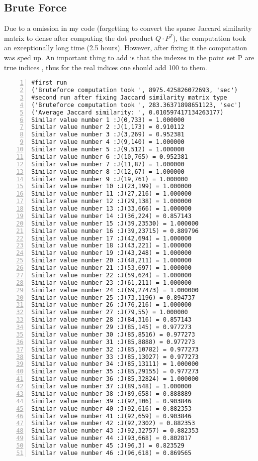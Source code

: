 \subsection{Brute Force}
Due to a omission in my code (forgetting to convert the sparse Jaccard similarity matrix to dense after computing the dot product $Q \cdot P^T$), the computation took an exceptionally long time (2.5 hours). However, after fixing it the computation was sped up. An important thing to add is that the indexes in the point set P are true indices , thus for the real indices one should add 100 to them.

\begin{lstlisting}[language={},numbers=left,numberstyle=\tiny,frame=single,breaklines=true,postbreak=\mbox{\textcolor{red}{$\hookrightarrow$}\space}]
#first run
('Bruteforce computation took ', 8975.425826072693, 'sec')
#second run after fixing Jaccard similarity matrix type
('Bruteforce computation took ', 283.36371898651123, 'sec')
('Average Jaccard similarity: ', 0.010597417134263177)
Similar value number 1 :J(0,733) = 1.000000
Similar value number 2 :J(1,173) = 0.910112
Similar value number 3 :J(3,269) = 0.952381
Similar value number 4 :J(9,140) = 1.000000
Similar value number 5 :J(9,512) = 1.000000
Similar value number 6 :J(10,765) = 0.952381
Similar value number 7 :J(11,87) = 1.000000
Similar value number 8 :J(12,67) = 1.000000
Similar value number 9 :J(19,761) = 1.000000
Similar value number 10 :J(23,199) = 1.000000
Similar value number 11 :J(27,216) = 1.000000
Similar value number 12 :J(29,138) = 1.000000
Similar value number 13 :J(33,666) = 1.000000
Similar value number 14 :J(36,224) = 0.857143
Similar value number 15 :J(39,23530) = 1.000000
Similar value number 16 :J(39,23715) = 0.889796
Similar value number 17 :J(42,694) = 1.000000
Similar value number 18 :J(43,221) = 1.000000
Similar value number 19 :J(43,248) = 1.000000
Similar value number 20 :J(48,211) = 1.000000
Similar value number 21 :J(53,697) = 1.000000
Similar value number 22 :J(59,624) = 1.000000
Similar value number 23 :J(61,211) = 1.000000
Similar value number 24 :J(69,27473) = 1.000000
Similar value number 25 :J(73,1196) = 0.894737
Similar value number 26 :J(76,216) = 1.000000
Similar value number 27 :J(79,55) = 1.000000
Similar value number 28 :J(84,316) = 0.857143
Similar value number 29 :J(85,145) = 0.977273
Similar value number 30 :J(85,8516) = 0.977273
Similar value number 31 :J(85,8888) = 0.977273
Similar value number 32 :J(85,10782) = 0.977273
Similar value number 33 :J(85,13027) = 0.977273
Similar value number 34 :J(85,13111) = 1.000000
Similar value number 35 :J(85,29155) = 0.977273
Similar value number 36 :J(85,32824) = 1.000000
Similar value number 37 :J(89,548) = 1.000000
Similar value number 38 :J(89,658) = 0.888889
Similar value number 39 :J(92,106) = 0.903846
Similar value number 40 :J(92,616) = 0.882353
Similar value number 41 :J(92,659) = 0.903846
Similar value number 42 :J(92,2302) = 0.882353
Similar value number 43 :J(92,32757) = 0.882353
Similar value number 44 :J(93,668) = 0.802817
Similar value number 45 :J(96,3) = 0.823529
Similar value number 46 :J(96,618) = 0.869565
\end{lstlisting}

